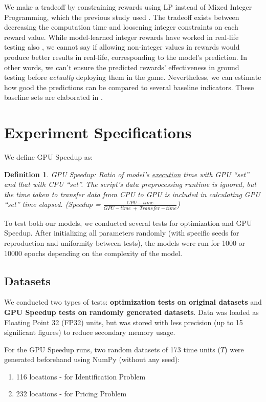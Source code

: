 \documentclass[12pt]{article}
\newtheorem{mydef}{Definition}
\begin{document}
    We make a tradeoff by constraining rewards using LP instead of Mixed Integer Programming, which the previous study used \cite{Xue2016Avi2}. The tradeoff exists between decreasing the computation time and loosening integer constraints on each reward value. While model-learned integer rewards have worked in real-life testing also \cite{Xue2016Avi2}, we cannot say if allowing non-integer values in rewards would produce better results in real-life, corresponding to the model's prediction. In other words, we can't ensure the predicted rewards' effectiveness in ground testing before \textit{actually} deploying them in the game. Nevertheless, we can estimate how good the predictions can be compared to several baseline indicators. These baseline sets are elaborated in .
    
    \section{Experiment Specifications} \label{sec:Experiment Specifications}
    We define GPU Speedup as:
    \begin{mydef} \label{def:GPU Speedup}
        GPU Speedup: Ratio of model's \underline{execution} time with GPU ``set'' and that with CPU ``set''. The script's data preprocessing runtime is ignored, but the time taken to transfer data from CPU to GPU is included in calculating GPU ``set'' time elapsed. (Speedup = $\frac{CPU-time}{GPU-time\; +\; Transfer-time}$)
    \end{mydef}

    To test both our models, we conducted several tests for optimization and GPU Speedup. After initializing all parameters randomly (with specific seeds for reproduction and uniformity between tests), the models were run for 1000 or 10000 epochs depending on the complexity of the model.
    
    \subsection{Datasets} \label{sec:Datasets}
    We conducted two types of tests: \textbf{optimization tests on original datasets} and \textbf{GPU Speedup tests on randomly generated datasets}. Data was loaded as Floating Point 32 (FP32) units, but was stored with less precision (up to 15 significant figures) to reduce secondary memory usage.
    
    For the GPU Speedup runs, two random datasets of 173 time units ($T$) were generated beforehand using NumPy (without any seed):
    \begin{enumerate} 
        \item 116 locations - for Identification Problem
        \item 232 locations - for Pricing Problem
    \end{enumerate}
    
\end{document}
